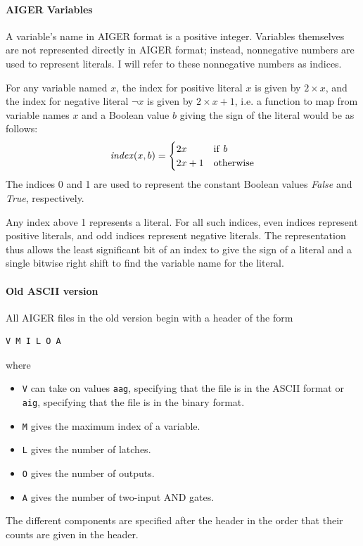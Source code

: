 \documentclass[12pt,a4paper,twoside,openright]{report}
\begin{document}
\paragraph{AIGER Variables}{
A variable's name in AIGER format is a positive integer. Variables themselves
are not represented directly in AIGER format; instead, nonnegative numbers
are used to represent literals.
I will refer to these nonnegative numbers as indices.

For any variable named $x$, the index for positive literal $x$ is given by
$2 \times x$, and the index for negative literal $\neg x$ is given by
$2 \times x + 1$, i.e. a function to map from variable names $x$ and a Boolean
value $b$ giving the sign of the literal would be as follows:
$${\it index}(x, b) =
\begin{cases}
2x & {\rm if}~b \\
2x + 1 & {\rm otherwise}
\end{cases}$$
The indices 0 and 1 are used to represent the constant Boolean values {\it False}
and {\it True}, respectively.

Any index above 1 represents a literal. For all such
indices, even indices represent positive literals, and odd indices
represent negative literals. The representation thus allows
the least significant bit of an index to give the sign of a literal
and a single bitwise right shift to find the variable name for the literal.

\paragraph{Old ASCII version}{
All AIGER files in the old version begin with a header of the form
\begin{verbatim}
V M I L O A
\end{verbatim}
where
\begin{itemize}
\item \verb,V, can take on values \verb,aag,, specifying that the file is in the ASCII format or \verb,aig,,
specifying that the file is in the binary format.
\item \verb,M, gives the maximum index of a variable.
\item \verb,L, gives the number of latches.
\item \verb,O, gives the number of outputs.
\item \verb,A, gives the number of two-input AND gates.
\end{itemize}

The different components are specified after the header
in the order that their counts are given in the header.

}}
\end{document}
